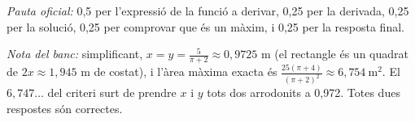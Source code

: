 \begin{apartats}
\begin{solucio}
\textit{Pauta oficial:} 0,5 per l'expressió de la funció a derivar, 0,25 per la derivada, 0,25 per la solució,
0,25 per comprovar que és un màxim, i 0,25 per la resposta final.

\textit{Nota del banc:} simplificant, $x=y=\frac{5}{\pi+2}\approx0{,}9725$ m (el rectangle és un quadrat de
$2x\approx1{,}945$ m de costat), i l'àrea màxima exacta és
$\frac{25(\pi+4)}{(\pi+2)^2}\approx6{,}754\ \text{m}^2$. El $6{,}747\ldots$ del criteri surt de prendre $x$ i
$y$ tots dos arrodonits a 0,972. Totes dues respostes són correctes.
\end{solucio}

\end{apartats}
